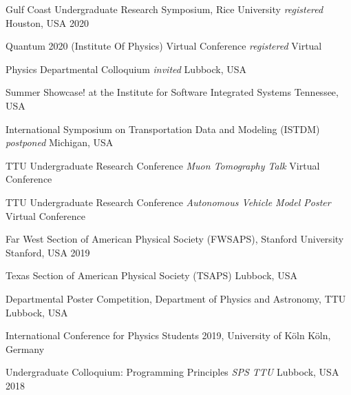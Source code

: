 
\begin{cvhonors}
    \cvhonor
    {Gulf Coast Undergraduate Research Symposium, Rice University}
    {\textit{\scriptsize registered}}
    {Houston, USA}
    {2020}

    \cvhonor
    {Quantum 2020 (Institute Of Physics) Virtual Conference}
    {\textit{\scriptsize registered}}
    {Virtual}
    {}

    \cvhonor
    {Physics Departmental Colloquium}
    {\textit{\scriptsize invited}}
    {Lubbock, USA}
    {}
    
    \cvhonor
    {Summer Showcase! at the Institute for Software Integrated Systems}
    {}
    {Tennessee, USA}
    {}

    \cvhonor
    { International Symposium on Transportation Data and Modeling (ISTDM)}
    {\textit{\scriptsize postponed}}
    {Michigan, USA}
    {}

    \cvhonor
    {TTU Undergraduate Research Conference}
    {\textit{\scriptsize Muon Tomography Talk}}
    {Virtual Conference}
    {}

    \cvhonor
    {TTU Undergraduate Research Conference}
    {\textit{\scriptsize Autonomous Vehicle Model Poster}}
    {Virtual Conference}
    {}

    \cvhonor
    {Far West Section of American Physical Society (FWSAPS), Stanford University}
    {}
    {Stanford, USA}
    {2019}

    \cvhonor
    {Texas Section of American Physical Society (TSAPS)}
    {}
    {Lubbock, USA}
    {}

    \cvhonor
    {Departmental Poster Competition, Department of Physics and Astronomy, TTU}
    {}
    {Lubbock, USA}
    {}

    \cvhonor
    {International Conference for Physics Students 2019, University of Köln}
    {}
    {Köln, Germany}
    {}

    \cvhonor
    {Undergraduate Colloquium: Programming Principles}
    {\textit{\scriptsize SPS TTU}}
    {Lubbock, USA}
    {2018}

\end{cvhonors}
